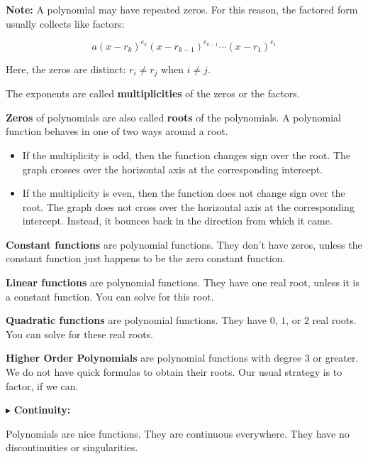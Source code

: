 \documentclass{ximera}
\begin{document}
\textbf{Note:} A polynomial may have repeated zeros.  For this reason, the factored form usually collects like factors:


\[   a (x - r_k)^{e_k} (x - r_{k-1})^{e_{k-1}} \cdots (x - r_1)^{e_1}             \]


Here, the zeros are distinct:  $r_i \ne r_j$ when $i \ne j$.

The exponents are called \textbf{\textcolor{purple!85!blue}{multiplicities}} of the zeros or the factors. 



\textbf{Zeros} of polynomials are also called \textbf{roots} of the polynomials.  A polynomial function behaves in one of two ways around a root.

\begin{itemize}
\item If the multiplicity is odd, then the function changes sign over the root.  The graph crosses over the horizontal axis at the corresponding intercept.
\item If the multiplicity is even, then the function does not change sign over the root.  The graph does not cross over the horizontal axis at the corresponding intercept. Instead, it bounces back in the direction from which it came.
\end{itemize}


\textbf{Constant functions} are polynomial functions.  They don't have zeros, unless the constant function just happens to be the zero constant function.  


\textbf{Linear functions} are polynomial functions. They have one real root, unless it is a constant function.  You can solve for this root. 


\textbf{Quadratic functions} are polynomial functions. They have $0$, $1$, or $2$ real roots.  You can solve for these real roots. 


\textbf{Higher Order Polynomials} are polynomial functions with degree $3$ or greater.  We do not have quick formulas to obtain their roots.  Our usual strategy is to factor, if we can.  





$\blacktriangleright$ \textbf{\textcolor{red!10!blue!90!}{Continuity:}} 


Polynomials are nice functions.  They are continuous everywhere.  They have no discontinuities or singularities.
\end{document}
